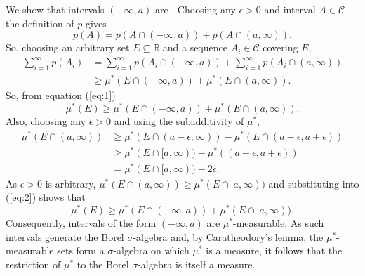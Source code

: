 \documentclass[12pt]{article}
\begin{document}
We show that intervals $(-\infty,a)$ are . Choosing any $\epsilon > 0$ and interval $A\in\mathcal{C}$ the definition of $p$ gives
\begin{equation*}
p(A)=p(A\cap(-\infty,a))+p(A\cap(a,\infty)).
\end{equation*}
So, choosing an arbitrary set $E\subseteq\mathbb{R}$ and a sequence $A_i\in\mathcal{C}$ covering $E$,
\begin{equation*}\begin{split}
\sum_{i=1}^\infty p(A_i) &=\sum_{i=1}^\infty p(A_i\cap (-\infty,a))+\sum_{i=1}^\infty p(A_i\cap(a,\infty))\\
&\ge \mu^*(E\cap(-\infty,a))+\mu^*(E\cap(a,\infty)).
\end{split}\end{equation*}
So, from equation (\ref{eq:1})
\begin{equation}\label{eq:2}
\mu^*(E)\ge \mu^*(E\cap(-\infty,a))+\mu^*(E\cap(a,\infty)).
\end{equation}
Also, choosing any $\epsilon>0$ and using the subadditivity of $\mu^*$,
\begin{equation*}\begin{split}
\mu^*(E\cap(a,\infty))&\ge\mu^*(E\cap(a-\epsilon,\infty))-\mu^*(E\cap(a-\epsilon,a+\epsilon))\\
&\ge\mu^*(E\cap[a,\infty))-\mu^*((a-\epsilon,a+\epsilon))\\
&=\mu^*(E\cap[a,\infty))-2\epsilon.
\end{split}\end{equation*}
As $\epsilon>0$ is arbitrary, $\mu^*(E\cap(a,\infty))\ge\mu^*(E\cap[a,\infty))$ and substituting into (\ref{eq:2}) shows that
\begin{equation*}
\mu^*(E)\ge \mu^*(E\cap(-\infty,a))+\mu^*(E\cap[a,\infty)).
\end{equation*}
Consequently, intervals of the form $(-\infty,a)$ are $\mu^*$-measurable. As such intervals generate the Borel $\sigma$-algebra and, by Caratheodory's lemma, the $\mu^*$-measurable sets form a $\sigma$-algebra on which $\mu^*$ is a measure, it follows that the restriction of $\mu^*$ to the Borel $\sigma$-algebra is itself a measure.

\end{document}
